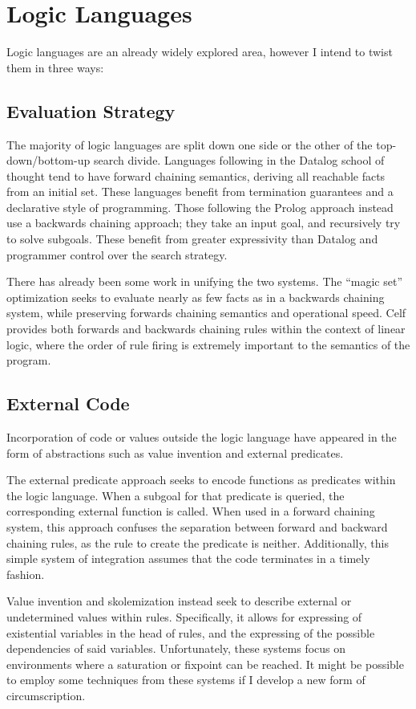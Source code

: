 \section{Logic Languages}
Logic languages are an already widely explored area, however I intend to twist them in three ways:
\subsection{Evaluation Strategy}
The majority of logic languages are split down one side or the other of the top-down/bottom-up search divide.
Languages following in the Datalog\cite{datalog} school of thought tend to have forward chaining semantics, deriving all reachable facts from an initial set.
These languages benefit from termination guarantees and a declarative style of programming.
Those following the Prolog\cite{prolog} approach instead use a backwards chaining approach;
they take an input goal, and recursively try to solve subgoals.
These benefit from greater expressivity than Datalog and programmer control over the search strategy.

There has already been some work in unifying the two systems.
The ``magic set''\cite{magicset} optimization seeks to evaluate nearly as few facts as in a backwards chaining system, while preserving forwards chaining semantics and operational speed.
Celf\cite{celf} provides both forwards and backwards chaining rules within the context of linear logic, where the order of rule firing is extremely important to the semantics of the program.
\subsection{External Code}
Incorporation of code or values outside the logic language have appeared in the form of abstractions such as value invention and external predicates.

The external predicate approach seeks to encode functions as predicates within the logic language.
When a subgoal for that predicate is queried, the corresponding external function is called\cite{gnuprolog}.
When used in a forward chaining system, this approach confuses the separation between forward and backward chaining rules, as the rule to create the predicate is neither.
Additionally, this simple system of integration assumes that the code terminates in a timely fashion.

Value invention and skolemization\cite{Calimeri2007c,Bry2010c} instead seek to describe external or undetermined values within rules.
Specifically, it allows for expressing of existential variables in the head of rules, and the expressing of the possible dependencies of said variables.
Unfortunately, these systems focus on environments where a saturation or fixpoint can be reached.
It might be possible to employ some techniques from these systems if I develop a new form of circumscription\cite{circumscription}.

